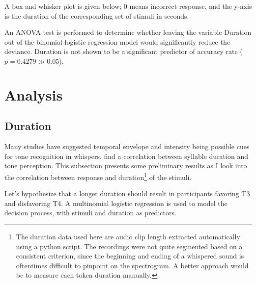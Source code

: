 \documentclass[12pt,letterpaper]{scrartcl}
\begin{document}
A box and whisker plot is given below; 0 means incorrect response, and the y-axis is the duration of the corresponding set of stimuli in seconds.


An ANOVA test is performed to determine whether leaving the variable Duration out of the binomial logistic regression model would significantly reduce the deviance. Duration is not shown to be a significant predictor of accuracy rate ($p = 0.4279 \gg 0.05$).


\section{Analysis}


\subsection{Duration}

Many studies have suggested temporal envelope and intensity being possible cues for tone recognition in whispers. \cite{liu.samuel2004PerceptionMandarinLexical} find a correlation between syllable duration and tone perception. This subsection presents some preliminary results as I look into the correlation between response and duration\footnote{The duration data used here are audio clip length extracted automatically using a python script. The recordings were not quite segmented based on a consistent criterion, since the beginning and ending of a whispered sound is oftentimes difficult to pinpoint on the spectrogram. A better approach would be to measure each token duration manually.} of the stimuli.

Let's hypothesize that a longer duration should result in participants favoring T3 and disfavoring T4. A multinomial logistic regression is used to model the decision process, with stimuli and duration as predictors.

\end{document}
